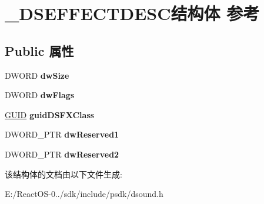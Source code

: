 \hypertarget{struct___d_s_e_f_f_e_c_t_d_e_s_c}{}\section{\+\_\+\+D\+S\+E\+F\+F\+E\+C\+T\+D\+E\+S\+C结构体 参考}
\label{struct___d_s_e_f_f_e_c_t_d_e_s_c}
\subsection*{Public 属性}
\begin{DoxyCompactItemize}
\item 
\mbox{\label{struct___d_s_e_f_f_e_c_t_d_e_s_c_ac2b441da964910f1c1a026e6800edb73}} 
D\+W\+O\+RD {\bfseries dw\+Size}
\item 
\mbox{\label{struct___d_s_e_f_f_e_c_t_d_e_s_c_a15978730bee43cc2e166b434a416732a}} 
D\+W\+O\+RD {\bfseries dw\+Flags}
\item 
\mbox{\label{struct___d_s_e_f_f_e_c_t_d_e_s_c_aea8712bc27e12d028b271b4d8c9b9069}} 
\hyperlink{interface_g_u_i_d}{G\+U\+ID} {\bfseries guid\+D\+S\+F\+X\+Class}
\item 
\mbox{\label{struct___d_s_e_f_f_e_c_t_d_e_s_c_a86663c2fb04e2fcf28ebc698a2d450c6}} 
D\+W\+O\+R\+D\+\_\+\+P\+TR {\bfseries dw\+Reserved1}
\item 
\mbox{\label{struct___d_s_e_f_f_e_c_t_d_e_s_c_a3c8b02cfbb975e8f867b89797b035afb}} 
D\+W\+O\+R\+D\+\_\+\+P\+TR {\bfseries dw\+Reserved2}
\end{DoxyCompactItemize}


该结构体的文档由以下文件生成\+:\begin{DoxyCompactItemize}
\item 
E\+:/\+React\+O\+S-\/0../sdk/include/psdk/dsound.\+h\end{DoxyCompactItemize}
